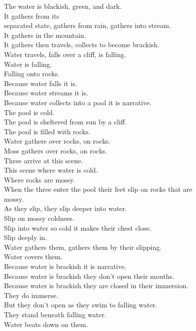 The water is blackish, green, and dark.\\
It gathers from its\\
separated state, gathers from rain, gathers into stream.\\
It gathers in the mountain.\\
It gathers then travels, collects to become brackish.\\
Water travels, falls over a cliff, is falling.\\
Water is falling.\\
Falling onto rocks.\\
Because water falls it is.\\
Because water streams it is.\\
Because water collects into a pool it is narrative.\\
The pool is cold.\\
The pool is sheltered from sun by a cliff.\\
The pool is filled with rocks.\\
Water gathers over rocks, on rocks.\\
Moss gathers over rocks, on rocks.\\
Three arrive at this scene.\\
This scene where water is cold.\\
Where rocks are mossy.\\
When the three enter the pool their feet slip on rocks that are\\
mossy.\\
As they slip, they slip deeper into water.\\
Slip on mossy coldness.\\
Slip into water so cold it makes their chest close.\\
Slip deeply in.\\
Water gathers them, gathers them by their slipping.\\
Water covers them.\\
Because water is brackish it is narrative.\\
Because water is brackish they don't open their mouths.\\
Because water is brackish they are closed in their immersion.\\
They do immerse.\\
But they don't open as they swim to falling water.\\
They stand beneath falling water.\\
Water beats down on them.\\
